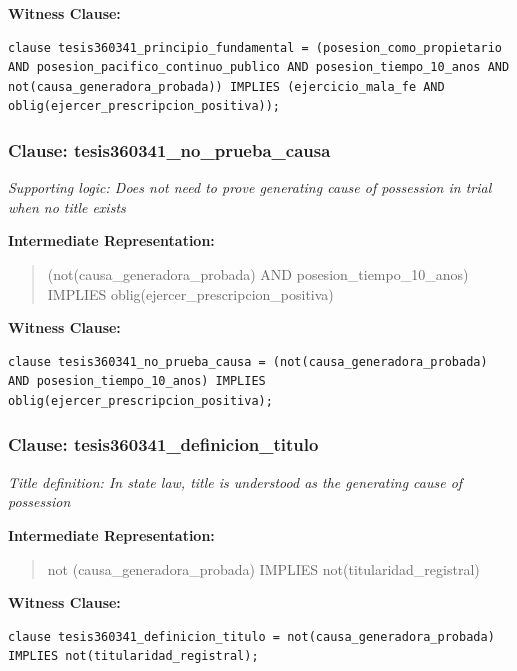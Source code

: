 \documentclass[11pt,a4paper]{article}
\begin{document}
\textbf{Witness Clause:}

\begin{lstlisting}[style=witnessstyle, language=Witness]
clause tesis360341_principio_fundamental = (posesion_como_propietario AND posesion_pacifico_continuo_publico AND posesion_tiempo_10_anos AND not(causa_generadora_probada)) IMPLIES (ejercicio_mala_fe AND oblig(ejercer_prescripcion_positiva));
\end{lstlisting}

\subsubsection{Clause: tesis360341\_no\_prueba\_causa}

\textit{Supporting logic: Does not need to prove generating cause of possession in trial when no title exists}

\textbf{Intermediate Representation:}

\begin{quote}
(not(causa\_generadora\_probada) AND posesion\_tiempo\_10\_anos) IMPLIES oblig(ejercer\_prescripcion\_positiva)
\end{quote}

\textbf{Witness Clause:}

\begin{lstlisting}[style=witnessstyle, language=Witness]
clause tesis360341_no_prueba_causa = (not(causa_generadora_probada) AND posesion_tiempo_10_anos) IMPLIES oblig(ejercer_prescripcion_positiva);
\end{lstlisting}

\subsubsection{Clause: tesis360341\_definicion\_titulo}

\textit{Title definition: In state law, title is understood as the generating cause of possession}

\textbf{Intermediate Representation:}

\begin{quote}
not (causa\_generadora\_probada) IMPLIES not(titularidad\_registral)
\end{quote}

\textbf{Witness Clause:}

\begin{lstlisting}[style=witnessstyle, language=Witness]
clause tesis360341_definicion_titulo = not(causa_generadora_probada) IMPLIES not(titularidad_registral);
\end{lstlisting}
\end{document}
